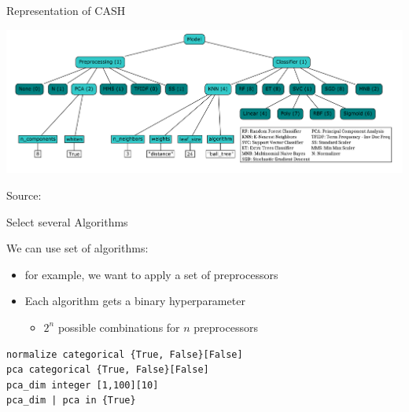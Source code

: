 \begin{frame}[c, fragile]{Representation of CASH}

\centering
\includegraphics[width=1.0\textwidth]{images/cash}

\hfill Source: 

\end{frame}

\begin{frame}[c, fragile]{Select several Algorithms}

We can use set of algorithms:
\begin{itemize}
  \item for example, we want to apply a set of preprocessors
  \item Each algorithm gets a binary hyperparameter
  \begin{itemize}
  	\item $2^n$ possible combinations for $n$ preprocessors	
  \end{itemize}
\end{itemize}

\begin{verbatim}
normalize categorical {True, False}[False]
pca categorical {True, False}[False]
pca_dim integer [1,100][10]
pca_dim | pca in {True}
\end{verbatim}

\end{frame}
